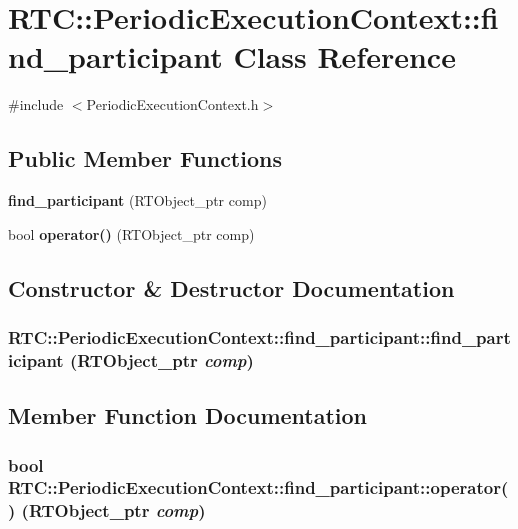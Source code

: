 \section{RTC::PeriodicExecutionContext::find\_\-participant Class Reference}
\label{classRTC_1_1PeriodicExecutionContext_1_1find__participant}


{\ttfamily \#include $<$PeriodicExecutionContext.h$>$}

\subsection*{Public Member Functions}
\begin{DoxyCompactItemize}
\item 
{\bf find\_\-participant} (RTObject\_\-ptr comp)
\item 
bool {\bf operator()} (RTObject\_\-ptr comp)
\end{DoxyCompactItemize}


\subsection{Constructor \& Destructor Documentation}
\subsubsection[{find\_\-participant}]{\setlength{\rightskip}{0pt plus 5cm}RTC::PeriodicExecutionContext::find\_\-participant::find\_\-participant (RTObject\_\-ptr {\em comp})\hspace{0.3cm}{\ttfamily  [inline]}}\label{classRTC_1_1PeriodicExecutionContext_1_1find__participant_a9a17ee3de46809d56fa740db0de63b95}


\subsection{Member Function Documentation}
\subsubsection[{operator()}]{\setlength{\rightskip}{0pt plus 5cm}bool RTC::PeriodicExecutionContext::find\_\-participant::operator() (RTObject\_\-ptr {\em comp})\hspace{0.3cm}{\ttfamily  [inline]}}\label{classRTC_1_1PeriodicExecutionContext_1_1find__participant_a8ff35c40d5e9998fd9516e675486f834}

